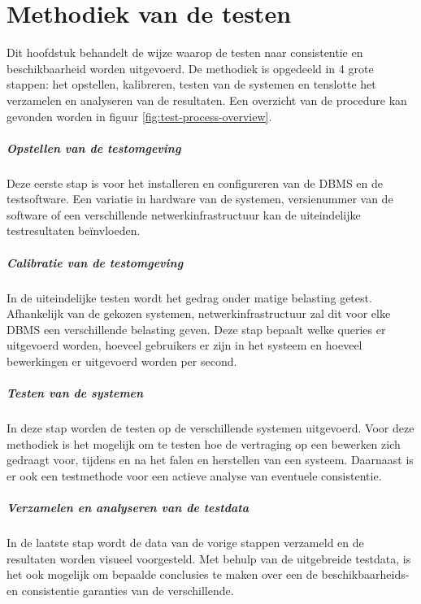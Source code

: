 \chapter{Methodiek van de testen}	
Dit hoofdstuk behandelt de wijze waarop de testen naar consistentie en beschikbaarheid worden uitgevoerd. 
De methodiek is opgedeeld in 4 grote stappen: het opstellen, kalibreren, testen van de systemen en tenslotte het verzamelen en analyseren van de resultaten. Een overzicht van de procedure kan gevonden worden in figuur \ref{fig:test-process-overview}.

\paragraph{Opstellen van de testomgeving} Deze eerste stap is voor het installeren en configureren van de DBMS en de testsoftware. Een variatie in hardware van de systemen, versienummer van de software of een verschillende netwerkinfrastructuur kan de uiteindelijke testresultaten beïnvloeden. 

\paragraph{Calibratie van de testomgeving} In de uiteindelijke testen wordt het gedrag onder matige belasting getest. Afhankelijk van de gekozen systemen, netwerkinfrastructuur zal dit voor elke DBMS een verschillende belasting geven. Deze stap bepaalt welke queries er uitgevoerd worden, hoeveel gebruikers er zijn in het systeem en hoeveel bewerkingen er uitgevoerd worden per second. 

\paragraph{Testen van de systemen} In deze stap worden de testen op de verschillende systemen uitgevoerd. Voor deze methodiek is het mogelijk om te testen hoe de vertraging op een bewerken zich gedraagt voor, tijdens en na het falen en herstellen van een systeem.  Daarnaast is er ook een testmethode voor een actieve analyse van eventuele consistentie. 

\paragraph{Verzamelen en analyseren van de testdata} In de laatste stap wordt de data van de vorige stappen verzameld en de resultaten worden visueel voorgesteld. Met behulp van de uitgebreide testdata, is het ook mogelijk om bepaalde conclusies te maken over een de beschikbaarheids- en consistentie garanties van de verschillende. 

